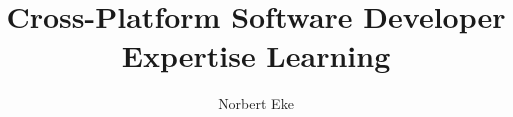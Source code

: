 \documentclass[12pt,letterpaper]{report}
\begin{document}

\title{Cross-Platform Software Developer Expertise Learning}
\author{Norbert Eke}

 




\graphicspath{{figures/}}





\end{document}
